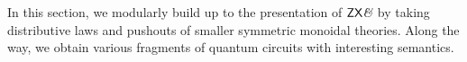 In this section, we modularly build up to the presentation of $\mathsf{ZX}\textit{\&}$ by taking distributive laws and pushouts of smaller symmetric monoidal theories.  Along the way, we obtain various fragments of quantum circuits with interesting semantics.


%
%

%
%
%
%
%
%

